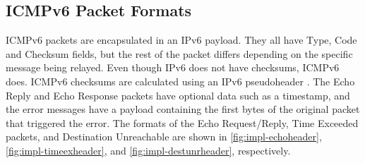 \subsection{ICMPv6 Packet Formats}
\label{sec:3.5.1}

ICMPv6 packets are encapsulated in an IPv6 payload. They all have Type, Code and Checksum fields, but the rest of the packet differs depending on the specific message being relayed. Even though IPv6 does not have checksums, ICMPv6 does. ICMPv6 checksums are calculated using an IPv6 pseudoheader \cite{ICMPv6Specs}. The Echo Reply and Echo Response packets have optional data such as a timestamp, and the error messages have a payload containing the first bytes of the original packet that triggered the error. The formats of the Echo Request/Reply, Time Exceeded packets, and Destination Unreachable are shown in \cref{fig:impl-echoheader}, \cref{fig:impl-timeexheader}, and \cref{fig:impl-destunrheader}, respectively.

